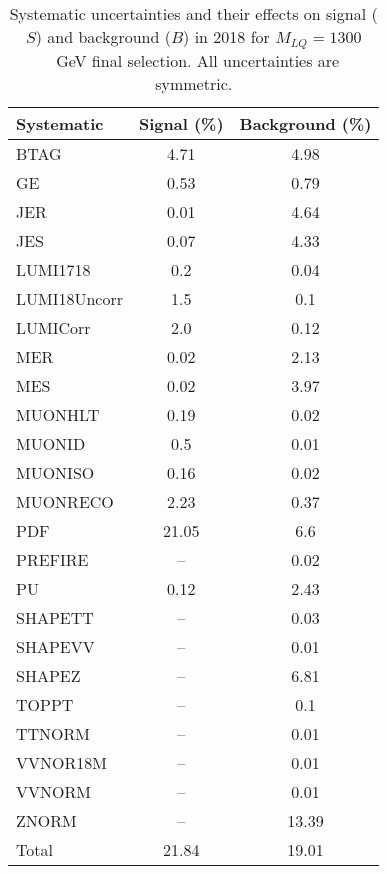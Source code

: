 \begin{table}[htbp]
\begin{center}
\caption{Systematic uncertainties and their effects on signal ($S$) and background ($B$) in 2018 for $M_{LQ}=1300$~GeV final selection. All uncertainties are symmetric.}
\begin{tabular}{lcc}
\hline\hline
Systematic & Signal (\%) & Background (\%) \\ \hline 
BTAG & 4.71 & 4.98\\ 
GE & 0.53 & 0.79\\ 
JER & 0.01 & 4.64\\ 
JES & 0.07 & 4.33\\ 
LUMI1718 & 0.2 & 0.04\\ 
LUMI18Uncorr & 1.5 & 0.1\\ 
LUMICorr & 2.0 & 0.12\\ 
MER & 0.02 & 2.13\\ 
MES & 0.02 & 3.97\\ 
MUONHLT & 0.19 & 0.02\\ 
MUONID & 0.5 & 0.01\\ 
MUONISO & 0.16 & 0.02\\ 
MUONRECO & 2.23 & 0.37\\ 
PDF & 21.05 & 6.6\\ 
PREFIRE & -- & 0.02\\ 
PU & 0.12 & 2.43\\ 
SHAPETT & -- & 0.03\\ 
SHAPEVV & -- & 0.01\\ 
SHAPEZ & -- & 6.81\\ 
TOPPT & -- & 0.1\\ 
TTNORM & -- & 0.01\\ 
VVNOR18M & -- & 0.01\\ 
VVNORM & -- & 0.01\\ 
ZNORM & -- & 13.39\\ 
Total & 21.84 & 19.01\\ \hline \hline
\end{tabular}
\label{tab:SysUncertainties_uujj_1300}
\end{center}
\end{table}

